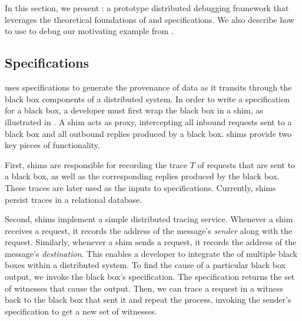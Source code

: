 \section{\fluent{}}
In this section, we present \fluent{}: a prototype distributed debugging
framework that leverages the theoretical foundations of \watprovenance{} and
\watprovenance{} specifications. We also describe how to use \fluent{} to debug
our motivating example from .

\subsection{\WatProvenance{} Specifications}
{}

\fluent{} uses \watprovenance{} specifications to generate the provenance of
data as it transits through the black box components of a distributed system.
In order to write a \watprovenance{} specification for a black box, a developer
must first wrap the black box in a \fluent{} shim, as illustrated in
. A shim acts as proxy, intercepting all inbound requests
sent to a black box and all outbound replies produced by a black box. \fluent{}
shims provide two key pieces of functionality.

First, \fluent{} shims are responsible for recording the trace $T$ of requests
that are sent to a black box, as well as the corresponding replies produced by
the black box. These traces are later used as the inputs to \watprovenance{}
specifications.  Currently, \fluent{} shims persist traces in a relational
database.

Second, \fluent{} shims implement a simple distributed tracing service.
Whenever a \fluent{} shim receives a request, it records the address of the
message's \emph{sender} along with the request. Similarly, whenever a \fluent{}
shim sends a request, it records the address of the message's
\emph{destination}.
%
This enables a developer to integrate the \watprovenance{} of multiple black
boxes within a distributed system. To find the cause of a particular black box
output, we invoke the black box's \watprovenance{} specification.  The
specification returns the set of witnesses that cause the output. Then, we can
trace a request in a witness back to the black box that sent it and repeat the
process, invoking the sender's \watprovenance{} specification to get a new set
of witnesses.

